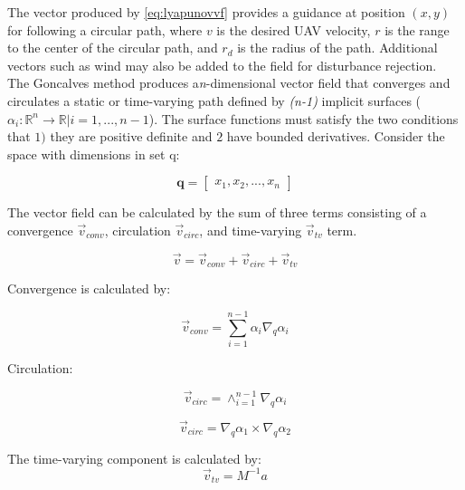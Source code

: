 \documentclass[conf]{new-aiaa}
\begin{document}
The vector produced by \ref{eq:lyapunovvf} provides a guidance at position $(x,y)$ for following a circular path, where $v$ is the desired UAV velocity, $r$ is the range to the center of the circular path, and $r_d$ is the radius of the path. Additional vectors such as wind may also be added to the field for disturbance rejection. \\

The Goncalves method produces a\textit{n}-dimensional vector field that converges and circulates a static or time-varying path defined by \textit{(n-1)} implicit surfaces ($\alpha_i:\mathbb{R}^n\rightarrow\mathbb{R} | i=1,...,n-1$). The surface functions must satisfy the two conditions that $1)$ they are positive definite and $2$ have bounded derivatives. Consider the space with dimensions in set q:

\begin{equation}
\mathbf{q} = \begin{bmatrix} x_1, x_2, ..., x_{n}\end{bmatrix}
\end{equation}

The vector field can be calculated by the sum of three terms consisting of a convergence $\vec{v}_{conv}$, circulation $\vec{v}_{circ}$, and time-varying $\vec{v}_{tv}$ term.


\begin{equation}\label{simpleGVF}
\vec{v} = \vec{v}_{conv} + \vec{v}_{circ} + \vec{v}_{tv} 
\end{equation}	

Convergence is calculated by:

\begin{equation}
\vec{v}_{conv} = \sum_{i=1}^{n-1}\alpha_i\nabla_q\alpha_i  
\label{convOnly}
\end{equation}

Circulation:

\begin{equation}
\vec{v}_{circ} =  \wedge_{i=1}^{n-1}\nabla_q\alpha_i 
\label{circOnly}
\end{equation}

\begin{equation}
\vec{v}_{circ} =  \nabla_q\alpha_1 \times \nabla_q\alpha_2 
\label{circOnlySimp}
\end{equation}

The time-varying component is calculated by:
\begin{equation}
\label{tv}
\vec{v}_{tv} = M^{-1}a
\end{equation}
\end{document}
